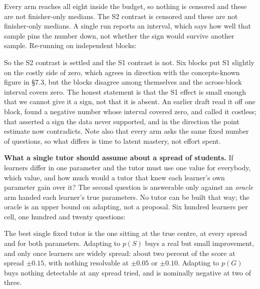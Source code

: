 \documentclass[11pt]{article}
\begin{document}


\noindent Every arm reaches all eight inside the budget, so nothing is
censored and these are not finisher-only medians. The S2 contrast is
censored and these are not finisher-only medians. A single run reports an
interval, which says how well that sample pins the number down, not whether
the sign would survive another sample. Re-running on independent blocks:



\noindent So the S2 contrast is settled and the S1 contrast is not. Six blocks
put S1 slightly on the costly side of zero, which agrees in direction with the
concepts-known figure in \S7.3, but the blocks disagree among themselves and
the across-block interval covers zero. The honest statement is that the S1
effect is small enough that we cannot give it a sign, not that it is absent.
An earlier draft read it off one block, found a negative number whose interval
covered zero, and called it costless; that asserted a sign the data never
supported, and in the direction the point estimate now contradicts. Note also that every arm asks the same
fixed number of questions, so what differs is time to latent mastery, not
effort spent.

\textbf{What a single tutor should assume about a spread of students.}
If learners differ in one parameter and the tutor must use one value for
everybody, which value, and how much would a tutor that knew each
learner's own parameter gain over it? The second question is answerable
only against an \emph{oracle} arm handed each learner's true parameters.
No tutor can be built that way; the oracle is an upper bound on adapting,
not a proposal. Six hundred learners per cell, one hundred and twenty
questions:



\noindent The best single fixed tutor is the one sitting at the true
centre, at every spread and for both parameters. Adapting to $p(S)$ buys a
real but small improvement, and only once learners are widely spread:
about two percent of the score at spread $\pm 0.15$, with nothing
resolvable at $\pm 0.05$ or $\pm 0.10$. Adapting to $p(G)$ buys nothing
detectable at any spread tried, and is nominally negative at two of three.
\end{document}
